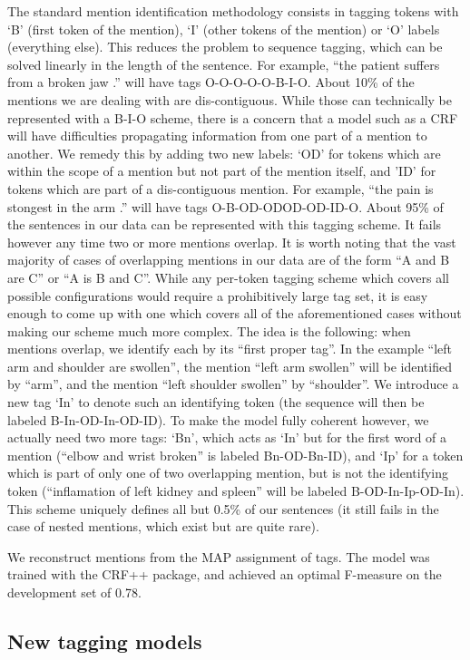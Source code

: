 \documentclass[10pt,a4paper]{article}
\begin{document}
The standard mention identification methodology consists in tagging tokens
with ‘B’ (first token of the mention), ‘I’ (other tokens of the mention) or ‘O’
labels (everything else). This reduces the problem to sequence tagging, which
can be solved linearly in the length of the sentence. For example, “the patient
suffers from a broken jaw .” will have tags O-O-O-O-O-B-I-O.
About 10\% of the mentions we are dealing with are dis-contiguous. While
those can technically be represented with a B-I-O scheme, there is a concern
that a model such as a CRF will have difficulties propagating information from
one part of a mention to another. We remedy this by adding two new labels:
‘OD’ for tokens which are within the scope of a mention but not part of the
mention itself, and ’ID’ for tokens which are part of a dis-contiguous mention.
For example, “the pain is stongest in the arm .” will have tags O-B-OD-ODOD-OD-ID-O.
About 95\% of the sentences in our data can be represented with this tagging
scheme. It fails however any time two or more mentions overlap.
It is worth noting that the vast majority of cases of overlapping mentions
in our data are of the form “A and B are C” or “A is B and C”. While any
per-token tagging scheme which covers all possible configurations would require
a prohibitively large tag set, it is easy enough to come up with one which covers
all of the aforementioned cases without making our scheme much more complex.
The idea is the following: when mentions overlap, we identify each by its
“first proper tag”. In the example “left arm and shoulder are swollen”, the
mention “left arm swollen” will be identified by “arm”, and the mention “left
shoulder swollen” by “shoulder”. We introduce a new tag ‘In’ to denote such
an identifying token (the sequence will then be labeled B-In-OD-In-OD-ID).
To make the model fully coherent however, we actually need two more tags:
‘Bn’, which acts as ‘In’ but for the first word of a mention (“elbow and wrist
broken” is labeled Bn-OD-Bn-ID), and ‘Ip’ for a token which is part of only one
of two overlapping mention, but is not the identifying token (“inflamation of
left kidney and spleen” will be labeled B-OD-In-Ip-OD-In).
This scheme uniquely defines all but 0.5\% of our sentences (it still fails in
the case of nested mentions, which exist but are quite rare).

 We reconstruct mentions from the MAP assignment of tags. The model was trained with the CRF++ package, and achieved an optimal F-measure on the development set of 0.78.

\subsection{New tagging models}
\end{document}
